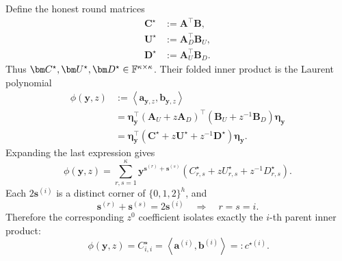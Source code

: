 \documentclass[runningheads]{llncs}
\begin{document}
Define the honest round matrices
\begin{equation}
\begin{aligned}
    \bm C^\star&:=\bm A^\top\bm B,\\
    \bm U^\star&:=\bm A_D^\top\bm B_U,\\
    \bm D^\star&:=\bm A_U^\top\bm B_D.
\end{aligned}
\label{eq:wht-honest-round-matrices}
\end{equation}
Thus
\(\bm C^\star,\bm U^\star,\bm D^\star
  \in\Field^{\kappa\times\kappa}\).
Their folded inner product is the Laurent polynomial
\begin{equation}
\begin{aligned}
    \phi(\bm y,z)
      &:=
      \left\langle
        \bm a_{\bm y,z},
        \bm b_{\bm y,z}
      \right\rangle\\
      &=
      \bm\eta_{\bm y}^{\top}
      \left(\bm A_U+z\bm A_D\right)^\top
      \left(\bm B_U+z^{-1}\bm B_D\right)
      \bm\eta_{\bm y}\\
      &=
      \bm\eta_{\bm y}^{\top}
      \left(
        \bm C^\star
        +z\bm U^\star
        +z^{-1}\bm D^\star
      \right)
      \bm\eta_{\bm y}.
\end{aligned}
\label{eq:wht-folded-inner-product}
\end{equation}
Expanding the last expression gives
\begin{equation}
    \phi(\bm y,z)
      =
      \sum_{r,s=1}^{\kappa}
      \bm y^{\bm s^{(r)}+\bm s^{(s)}}
      \left(
        C^\star_{r,s}
        +zU^\star_{r,s}
        +z^{-1}D^\star_{r,s}
      \right).
\label{eq:wht-folded-inner-product-expansion}
\end{equation}
Each \(2\bm s^{(i)}\) is a distinct corner of
\(\{0,1,2\}^{h}\), and
\[
    \bm s^{(r)}+\bm s^{(s)}=2\bm s^{(i)}
    \quad\Longrightarrow\quad
    r=s=i.
\]
Therefore the corresponding \(z^0\) coefficient isolates exactly the
\(i\)-th parent inner product:
\begin{equation}
    [\bm y^{2\bm s^{(i)}}z^0]\,
      \phi(\bm y,z)
      =
      C^\star_{i,i}
      =
      \left\langle\bm a^{(i)},\bm b^{(i)}\right\rangle
      =:c^{\star(i)}.
\label{eq:wht-interpolation}
\end{equation}
\end{document}
